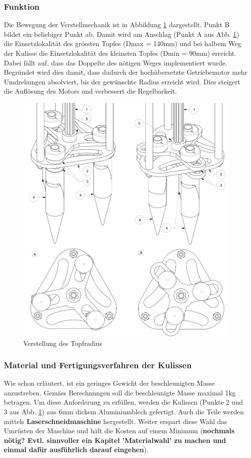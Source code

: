 \subsubsection{Funktion}
Die Bewegung der Verstellmechanik ist in Abbildung \ref{fig:motion_vm} dargestellt. Punkt B bildet ein beliebiger Punkt ab. Damit wird am Anschlag (Punkt A aus Abb. \ref{fig:motion_vm}) die Einsetzlokalität des grössten Topfes (Dmax = 140mm) und bei halbem Weg der Kulisse die Einsetzlokalität des kleinsten Topfes (Dmin = 90mm) erreicht. Dabei fällt auf, dass das Doppelte des nötigen Weges implementiert wurde. Begründet wird dies damit, dass dadurch der hochübersetzte Getriebemotor mehr Umdrehungen absolviert, bis der gewünschte Radius erreicht wird. Dies steigert die Auflösung des Motors und verbessert die Regelbarkeit.
	\begin{figure}[H]
	\includegraphics[scale=0.53]{Illustrationen/6-Umsetzung/motion_vm.jpg}
	\caption{Verstellung des Topfradius}
	\label{fig:motion_vm}
	\end{figure}
\subsubsection{Material und Fertigungsverfahren der Kulissen}
Wie schon erläutert, ist ein geringes Gewicht der beschleunigten Masse anzustreben. Gemäss Berechnungen soll die beschleunigte Masse maximal 1kg betragen. Um diese Anforderung zu erfüllen, werden die Kulissen (Punkte 2 und 3 aus Abb. \ref{fig:motion_vm}) aus 6mm dickem Aluminiumblech gefertigt. Auch die Teile werden mittels \textbf{Laserschneidmaschine} hergestellt. Weiter erspart diese Wahl das Umrüsten der Maschine und hält die Kosten auf einem Minimum (\textbf{nochmals nötig? Evtl. sinnvoller ein Kapitel 'Materialwahl' zu machen und einmal dafür ausführlich darauf eingehen}).